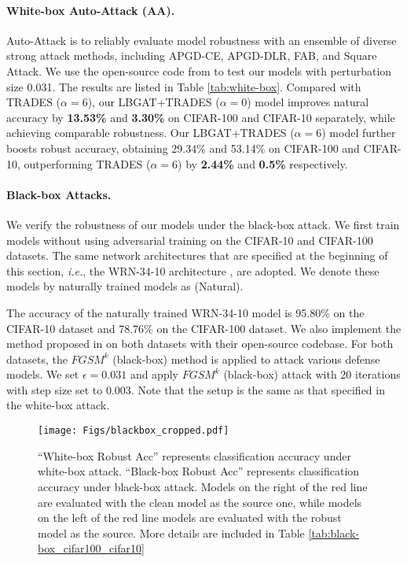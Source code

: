 \documentclass[10pt,twocolumn,letterpaper]{article}
\begin{document}
\paragraph{White-box Auto-Attack (AA).}
\vspace{-0.1in}
Auto-Attack \cite{croce2020reliable} is to reliably evaluate model robustness with an ensemble of diverse strong attack methods, including APGD-CE, APGD-DLR, FAB, and Square Attack. We use the open-source code from \cite{croce2020reliable} to test our models with perturbation size 0.031. The results are listed in Table \ref{tab:white-box}. Compared with TRADES ($\alpha=6$), our LBGAT+TRADES ($\alpha=0$) model improves natural accuracy by \textbf{13.53\%} and \textbf{3.30\%} on CIFAR-100 and CIFAR-10 separately, while achieving comparable robustness.
Our LBGAT+TRADES ($\alpha=6$) model further boosts robust accuracy, obtaining 29.34\% and 53.14\% on CIFAR-100 and CIFAR-10, outperforming TRADES ($\alpha=6$) by \textbf{2.44\%} and \textbf{0.5\%} respectively.

\paragraph{Black-box Attacks.}
We verify the robustness of our models under the black-box attack. We first train models without using adversarial training on the CIFAR-10 and CIFAR-100 datasets. The same network architectures that are specified at the beginning of this section, {\it i.e.}, the WRN-34-10 architecture \cite{DBLP:conf/bmvc/ZagoruykoK16}, are adopted. We denote these models by naturally trained models as (Natural). 

The accuracy of the naturally trained WRN-34-10 model is 95.80\% on the CIFAR-10 dataset and 78.76\% on the CIFAR-100 dataset. We also implement the method proposed in \cite{zhang2019theoretically} on both datasets with their open-source codebase. For both datasets, the $FGSM^{k}$ (black-box) method is applied to attack various defense models. We set $\epsilon = 0.031$ and apply $FGSM^{k}$ (black-box) attack with 20 iterations with step size set to 0.003. Note that the setup is the same as that specified in the white-box attack.

\begin{figure}[t]
	\begin{center}
		\texttt{[image: Figs/blackbox\_cropped.pdf]}
		\caption{``White-box Robust Acc'' represents classification accuracy under white-box attack. ``Black-box Robust Acc'' represents classification accuracy under black-box attack. Models on the right of the red line are evaluated with the clean model as the source one, while models on the left of the red line models are evaluated with the robust model as the source. More details are included in Table \ref{tab:black-box_cifar100_cifar10}}
		\label{fig:blackbox}
	\end{center}
\vspace{-0.1in}
\end{figure}
\end{document}
